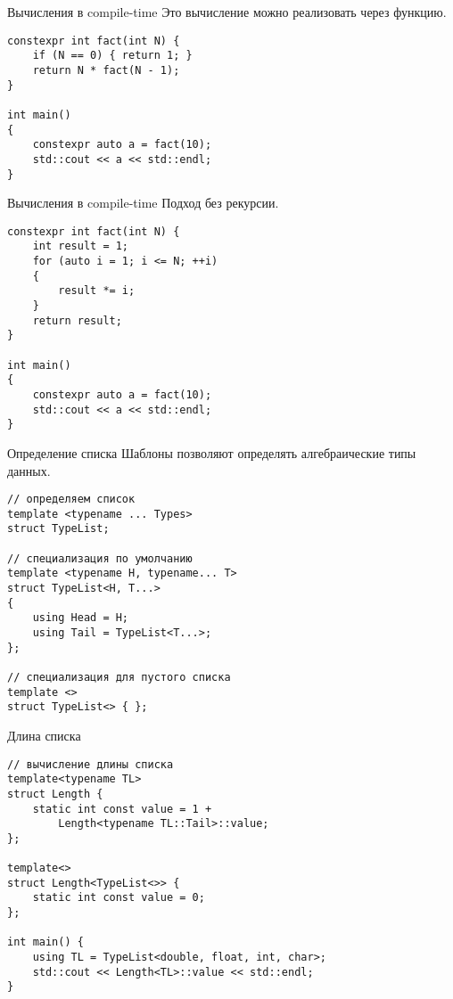 \documentclass{beamer}
\begin{document}
\begin{frame}[fragile]{Вычисления в compile-time}
    Это вычисление можно реализовать через  функцию.
\begin{lstlisting}
constexpr int fact(int N) {
    if (N == 0) { return 1; }
    return N * fact(N - 1);
}

int main() 
{
    constexpr auto a = fact(10);
    std::cout << a << std::endl;
}
\end{lstlisting}
\end{frame}

\begin{frame}[fragile]{Вычисления в compile-time}
    Подход без рекурсии.
\begin{lstlisting}
constexpr int fact(int N) {
    int result = 1;
    for (auto i = 1; i <= N; ++i)
    {
        result *= i;
    }
    return result;
}

int main() 
{
    constexpr auto a = fact(10);
    std::cout << a << std::endl;
}
\end{lstlisting}
\end{frame}


\begin{frame}[fragile]{Определение списка}
Шаблоны позволяют определять алгебраические типы данных.
\begin{lstlisting}
// определяем список
template <typename ... Types>
struct TypeList; 

// специализация по умолчанию
template <typename H, typename... T>
struct TypeList<H, T...> 
{
    using Head = H;
    using Tail = TypeList<T...>;
};

// специализация для пустого списка
template <>
struct TypeList<> { };
\end{lstlisting}
\end{frame}

\begin{frame}[fragile]{Длина списка}
\begin{lstlisting}
// вычисление длины списка
template<typename TL>
struct Length {
    static int const value = 1 +
        Length<typename TL::Tail>::value;
};

template<>
struct Length<TypeList<>> {
    static int const value = 0;
};

int main() {
    using TL = TypeList<double, float, int, char>;
    std::cout << Length<TL>::value << std::endl;
}
\end{lstlisting}
\end{frame}
\end{document}
